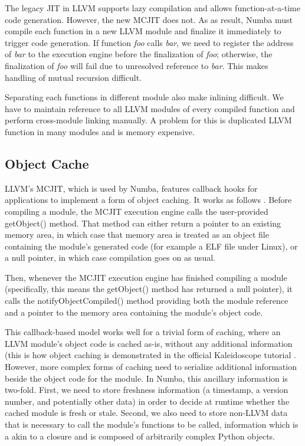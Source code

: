 \documentclass{acm_proc_article-sp}
\begin{document}
The legacy JIT in LLVM supports lazy compilation and allows function-at-a-time
code generation.  However, the new MCJIT does not. As as result, Numba must
compile each function in a new LLVM module and finalize it immediately to
trigger code generation. If function \textit{foo} calls \textit{bar},
we need to register the address of \textit{bar} to the execution engine
before the finalization of \textit{foo}; otherwise, the finalization of
\textit{foo} will fail due to unresolved reference to \textit{bar}.
This makes handling of mutual recursion difficult.

Separating each functions in different module also make inlining difficult.
We have to maintain reference to all LLVM modules of every compiled function
and perform cross-module linking manually. A problem for this is duplicated
LLVM function in many modules and is memory expensive.

\subsection{Object Cache}

LLVM's MCJIT, which is used by Numba, features callback hooks for
applications to implement a form of object caching.  It works
as follows \cite{llvmdoc:objectcache}.
Before compiling a module, the MCJIT execution engine
calls the user-provided getObject() method.  That method can either
return a pointer to an existing memory area, in which case that
memory area is treated as an object file containing the module's
generated code (for example a ELF file under Linux), or a null pointer,
in which case compilation goes on as usual.

Then, whenever the MCJIT execution engine has finished compiling a
module (specifically, this means the getObject() method has returned
a null pointer), it calls the notifyObjectCompiled() method providing
both the module reference and a pointer to the memory area containing
the module's object code.

This callback-based model works well for a trivial form of caching,
where an LLVM module's object code is cached as-is, without any
additional information (this is how object caching is demonstrated in
the official Kaleidoscope tutorial \cite{llvmblog:kaleidoscope}.
However, more complex forms of
caching need to serialize additional information beside the object code
for the module.  In Numba, this ancillary information is two-fold.  First,
we need to store freshness information (a timestamp, a version number,
and potentially other data) in order to decide at runtime whether the
cached module is fresh or stale.  Second, we also need to store non-LLVM
data that is necessary to call the module's functions to be called,
information which is a akin to a closure and is composed of arbitrarily
complex Python objects.
\end{document}
